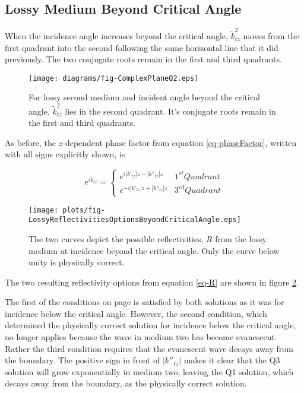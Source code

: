 \documentclass[12pt]{uthesis-v12}
\begin{document}
\subsection{Lossy Medium Beyond Critical Angle}
When the incidence angle increases beyond the critical angle, $\tilde{k}_{tz}^2$ moves from the first quadrant into the second following the same horizontal line that it did previously.  The two conjugate roots remain in the first and third quadrants.

\begin{figure}[ht]
\centering
  \texttt{[image: diagrams/fig-ComplexPlaneQ2.eps]}
\caption[$\tilde{k}_{tz}^2$ complex plane diagram, $\gamma<0$, $\theta_i>\theta_c$]{For lossy second medium and incident angle beyond the critical angle, $\tilde{k}_{tz}^2$ lies in the second quadrant. It's conjugate roots remain in the first and third quadrants.
 \label{fig-complexQ2}}
\end{figure}

As before, the $z$-dependent phase factor from equation \ref{eq-phaseFactor}, written with all signs explicitly shown, is

\begin{equation}
e^{i\tilde{k}_{tz}} = \begin{cases}
    e^{i|k'_{tz}|z-|k''_{tz}|z}       & 1^{st} Quadrant \\
    e^{-i|k'_{tz}|z+|k''_{tz}|z}      & 3^{rd} Quadrant
\end{cases}
\end{equation}

\begin{figure}[ht]
\centering
  \texttt{[image: plots/fig-LossyReflectivitiesOptionsBeyondCriticalAngle.eps]}
\caption[Two possible Reflectivities from lossy medium above critical angle]{The two curves depict the possible reflectivities, $R$ from the lossy medium at incidence beyond the critical angle. Only the curve below unity is physically correct.
 \label{fig-LossyReflectivitiesOptionsBeyondCriticalAngle}}
\end{figure}

The two resulting reflectivity options from equation \ref{eq-R} are shown in figure \ref{fig-LossyReflectivitiesOptionsBeyondCriticalAngle}.

The first of the conditions on page \pageref{conditions} is satisfied by both solutions as it was for incidence below the critical angle. However, the second condition, which determined the physically correct solution for incidence below the critical angle, no longer applies because the wave in medium two has become evanescent. Rather the third condition requires that the evanescent wave decays away from the boundary. The positive sign in front of $|k''_{tz}|$ makes it clear that the Q3 solution will grow exponentially in medium two, leaving the Q1 solution, which decays away from the boundary, as the physically correct solution.
\end{document}
